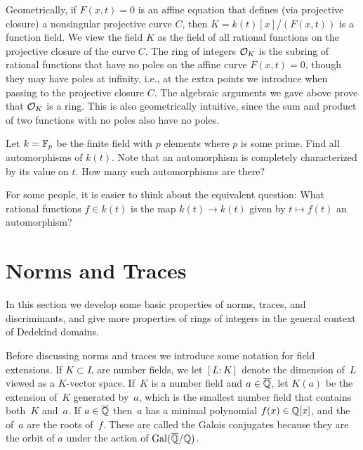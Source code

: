 Geometrically, if $F(x,t)=0$ is an affine equation that defines (via
projective closure) a nonsingular projective curve $C$, then
$K=k(t)[x]/(F(x,t))$ is a function field.  We view the field $K$ as
the field of all rational functions on the projective closure of the
curve $C$.  The ring of integers $\mathcal{O}_K$ is the subring of rational
functions that have no poles on the affine curve $F(x,t)=0$, though
they may have poles at infinity, i.e., at the extra points we
introduce when passing to the projective closure $C$.  The algebraic
arguments we gave above prove that $\mathcal{O}_K$ is a ring.  This is also
geometrically intuitive, since the sum and product of two functions
with no poles also have no poles.

\begin{exercise}
	Let $k = \mathbb{F}_p$ be the finite field with $p$ elements where $p$ is some prime. Find all automorphisms of $k(t)$. Note that an automorphism is completely characterized by its value on $t$. How many such automorphisms are there?

	\begin{hint}
		For some people, it is easier to think about the equivalent question: What rational functions $f\in k(t)$ is the map $k(t)\to k(t)$ given by $t\mapsto f(t)$ an automorphism?
	\end{hint}
\end{exercise}

\section{Norms and Traces}

In this section we develop some basic properties of norms, traces, and
discriminants, and give more properties of rings of integers in the
general context of Dedekind domains.

Before discussing norms and traces we introduce some notation for
field extensions.  If $K\subset L$ are number fields, we let $[L:K]$
denote the dimension of~$L$ viewed as a $K$-vector space.  If~$K$ is a
number field and $a\in \overline{\mathbb{Q}}$, let $K(a)$ be the extension of~$K$
generated by~$a$, which is the smallest number field that contains
both~$K$ and~$a$.  If $a\in\overline{\mathbb{Q}}$ then~$a$ has a minimal polynomial
$f(x)\in\mathbb{Q}[x]$, and the  of~$a$ are the roots
of~$f$. These are called the Galois conjugates because they are the orbit
of $a$ under the action of $\operatorname{Gal}(\overline{\mathbb{Q}}/\mathbb{Q})$.

